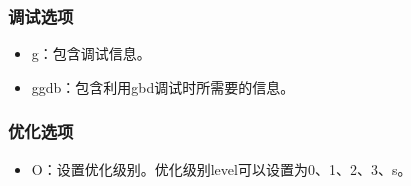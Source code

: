 \documentclass[a4paper,12pt,english]{sphinxmanual}
\begin{document}
\subsubsection{调试选项}
\label{\detokenize{compiler/gnu:id5}}\label{\detokenize{compiler/gnu:id6}}\begin{itemize}
\item {} 
\sphinxAtStartPar
\sphinxhyphen{}g：包含调试信息。

\item {} 
\sphinxAtStartPar
\sphinxhyphen{}ggdb：包含利用gbd调试时所需要的信息。

\end{itemize}


\subsubsection{优化选项}
\label{\detokenize{compiler/gnu:id7}}\label{\detokenize{compiler/gnu:id8}}\begin{itemize}
\item {} 
\sphinxAtStartPar
\sphinxhyphen{}O\sphinxstyleemphasis{{[}level{]}}：设置优化级别。优化级别level可以设置为0、1、2、3、s。

\end{itemize}
\end{document}
